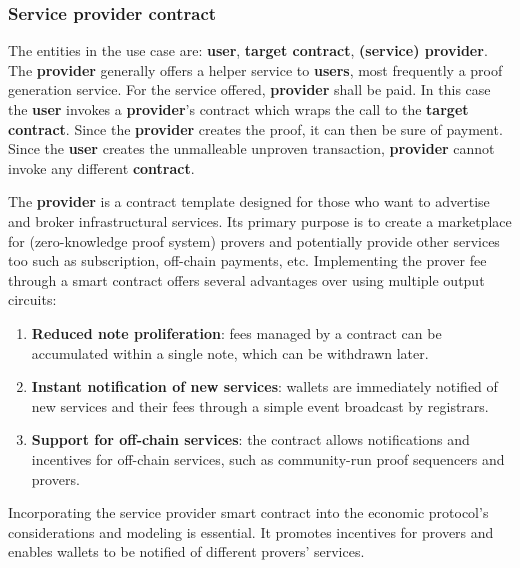 \documentclass[twocolumn, nofootinbib]{revtex4-2} %
\newcommand{\emphathize}[1]{\textbf{#1}\xspace}
\newcommand{\contract}{\emphathize{contract}}
\newcommand{\provider}{\emphathize{provider}}
\newcommand{\user}{\emphathize{user}}
\newcommand{\users}{\emphathize{users}}
\begin{document}
    \subsubsection{Service provider contract}\label{sec:specifications:scenario-3:service-provider-contract}
    The entities in the use case are: \user, \textbf{target contract},
    \textbf{(service) provider}.
    The \provider generally offers a helper service to \users,
    most frequently a proof generation service.
    For the service offered, \provider shall be paid.
    In this case the \user invokes a \provider's contract which
    wraps the call to the \textbf{target contract}.
    Since the \provider creates the proof, it can then be sure of
    payment.
    Since the \user creates the unmalleable unproven transaction,
    \provider cannot invoke any different \contract.

    The \provider is a contract template designed for those who want to
    advertise and broker infrastructural services.
    Its primary purpose is to create a marketplace for (zero-knowledge proof system)
    provers and potentially
    provide other services too such as subscription, off-chain payments, etc.
    Implementing the prover fee through a smart contract offers several
    advantages over using multiple output circuits:

    \begin{enumerate}
        \item \textbf{Reduced note proliferation}: fees managed by a contract
              can be accumulated within a single note, which can be withdrawn
              later.
        \item \textbf{Instant notification of new services}: wallets are
              immediately notified of new services and their fees through a
              simple event broadcast by registrars.
        \item \textbf{Support for off-chain services}: the contract allows
              notifications and incentives for off-chain services, such as
              community-run proof sequencers and provers.
    \end{enumerate}

    Incorporating the service provider smart contract into the economic
    protocol's considerations and modeling is essential.
    It promotes incentives for provers and enables wallets to be notified of
    different provers' services.
\end{document}

